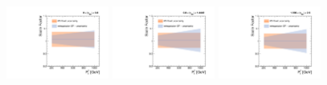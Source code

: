 \begin{figure}[!htbp]
  \includegraphics[width=0.3\textwidth]{fig/Extrapolate_2017_0_Compare.pdf}
  \includegraphics[width=0.3\textwidth]{fig/Extrapolate_2017_1_Compare.pdf}
  \includegraphics[width=0.3\textwidth]{fig/Extrapolate_2017_2_Compare.pdf}
 
  \label{fig:Extrapolation2017}
\end{figure}

